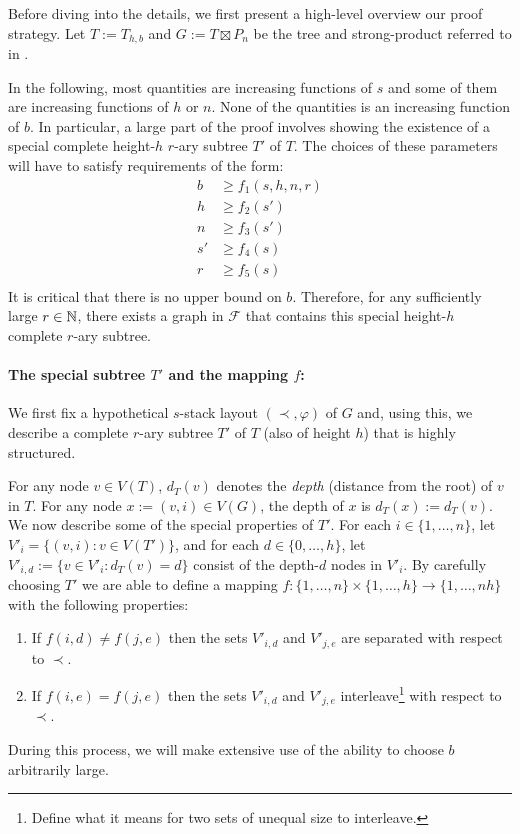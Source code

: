 \documentclass[kpfonts]{patmorin}
\begin{document}
Before diving into the details, we first present a high-level overview our proof strategy.  Let $T:=T_{h,b}$ and $G:=T\boxtimes P_n$ be the tree and strong-product referred to in .

In the following, most quantities are increasing functions of $s$ and some of them are increasing functions of $h$ or $n$.  None of the quantities is an increasing function of $b$.  In particular, a large part of the proof involves showing the existence of a special complete height-$h$ $r$-ary subtree $T'$ of $T$.  The choices of these parameters will have to satisfy requirements of the form:
\begin{align*}
  b & \ge f_1(s,h,n,r) \\
  h & \ge f_2(s') \\
  n & \ge f_3(s') \\
  s' & \ge f_4(s) \\
  r & \ge f_5(s) \\
\end{align*}
It is critical that there is no upper bound on $b$.  Therefore, for any sufficiently large $r\in\mathbb{N}$, there exists a graph in $\mathcal{F}$ that contains this special height-$h$ complete $r$-ary subtree.

\paragraph{The special subtree $T'$ and the mapping $f$:}

We first fix a hypothetical $s$-stack layout $(\prec,\varphi)$ of $G$ and, using this, we describe a complete $r$-ary subtree $T'$ of $T$ (also of height $h$) that is highly structured.

For any node $v\in V(T)$, $d_T(v)$ denotes the \emph{depth} (distance from the root) of $v$ in $T$.  For any node $x:=(v,i)\in V(G)$, the depth of $x$ is $d_T(x):=d_T(v)$.  We now describe some of the special properties of $T'$.  For each $i\in\{1,\ldots,n\}$, let $V'_i=\{(v,i):v\in V(T')\}$, and for each $d\in\{0,\ldots,h\}$, let $V'_{i,d}:=\{v\in V'_i:d_T(v)=d\}$ consist of the depth-$d$ nodes in $V'_i$. By carefully choosing $T'$ we are able to define a mapping $f:\{1,\ldots,n\}\times \{1,\ldots,h\}\to \{1,\ldots,nh\}$ with the following properties:
\begin{enumerate}
  \item If $f(i,d)\neq f(j,e)$ then the sets $V'_{i,d}$ and $V'_{j,e}$ are separated with respect to $\prec$.
  \item If $f(i,e)= f(j,e)$ then the sets $V'_{i,d}$ and $V'_{j,e}$ interleave\footnote{Define what it means for two sets of unequal size to interleave.} with respect to $\prec$.
\end{enumerate}
During this process, we will make extensive use of the ability to choose $b$ arbitrarily large. 
\end{document}
